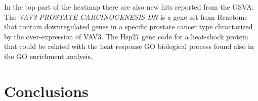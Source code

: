\documentclass[9pt,twocolumn,twoside]{gsajnl}
\begin{document}
In the top part of the heatmap there are also new hits reported from the GSVA. The  \textit{VAV3 PROSTATE CARCINOGENESIS DN} \citep{liu2008targeted} is a gene set from Reactome that contain downregulated genes in a specific prostate cancer type chractarized by the over-expression of VAV3. The Hsp27 gene code for a heat-shock protein that could be related with the heat response GO biological process found also in the GO enrichment analysis.



\section*{Conclusions}











\end{document}
